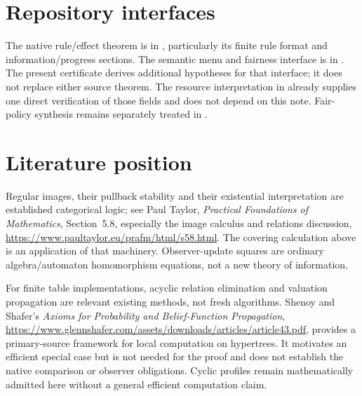 \documentclass[11pt]{article}
\begin{document}
\section{Repository interfaces}
The native rule/effect theorem is in , particularly its finite rule format and information/progress sections. The semantic menu and fairness interface is in . The present certificate derives additional hypotheses for that interface; it does not replace either source theorem. The resource interpretation in  already supplies one direct verification of those fields and does not depend on this note. Fair-policy synthesis remains separately treated in .

\section{Literature position}
Regular images, their pullback stability and their existential interpretation are established categorical logic; see Paul Taylor, \emph{Practical Foundations of Mathematics}, Section~5.8, especially the image calculus and relations discussion, \url{https://www.paultaylor.eu/prafm/html/s58.html}. The covering calculation above is an application of that machinery. Observer-update squares are ordinary algebra/automaton homomorphism equations, not a new theory of information.

For finite table implementations, acyclic relation elimination and valuation propagation are relevant existing methods, not fresh algorithms. Shenoy and Shafer's \emph{Axioms for Probability and Belief-Function Propagation}, \url{https://www.glennshafer.com/assets/downloads/articles/article43.pdf}, provides a primary-source framework for local computation on hypertrees. It motivates an efficient special case but is not needed for the proof and does not establish the native comparison or observer obligations. Cyclic profiles remain mathematically admitted here without a general efficient computation claim.
\end{document}

